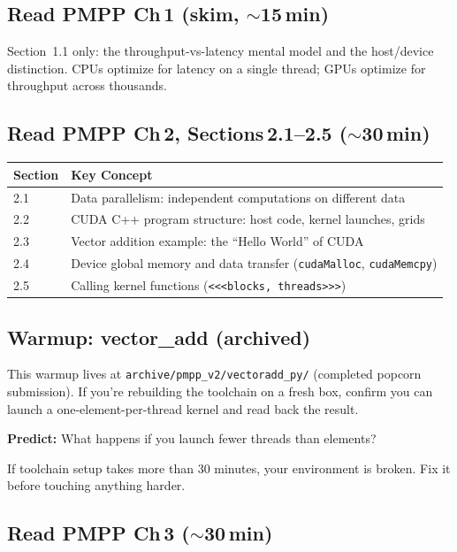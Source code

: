 \documentclass[11pt, letterpaper]{article}
\begin{document}
\subsection{Read PMPP Ch\,1 (skim, $\sim$15\,min)}

Section~1.1 only: the throughput-vs-latency mental model and the host/device distinction. CPUs optimize for latency on a single thread; GPUs optimize for throughput across thousands.

\subsection{Read PMPP Ch\,2, Sections\,2.1--2.5 ($\sim$30\,min)}

\begin{tabularx}{\textwidth}{@{}lX@{}}
\toprule
\textbf{Section} & \textbf{Key Concept} \\
\midrule
2.1 & Data parallelism: independent computations on different data \\
2.2 & CUDA C++ program structure: host code, kernel launches, grids \\
2.3 & Vector addition example: the ``Hello World'' of CUDA \\
2.4 & Device global memory and data transfer (\texttt{cudaMalloc}, \texttt{cudaMemcpy}) \\
2.5 & Calling kernel functions (\texttt{<<<blocks, threads>>>}) \\
\bottomrule
\end{tabularx}

\subsection{Warmup: vector\_add (archived)}

\begin{stepbox}
This warmup lives at \texttt{archive/pmpp\_v2/vectoradd\_py/} (completed popcorn submission). If you're rebuilding the toolchain on a fresh box, confirm you can launch a one-element-per-thread kernel and read back the result.

\textbf{Predict:} What happens if you launch fewer threads than elements?

If toolchain setup takes more than 30 minutes, your environment is broken. Fix it before touching anything harder.
\end{stepbox}

\subsection{Read PMPP Ch\,3 ($\sim$30\,min)}
\end{document}
